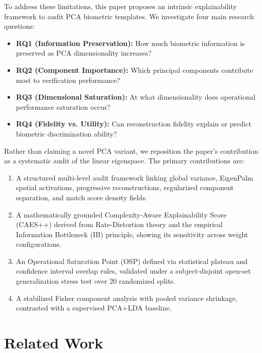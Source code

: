 \documentclass[conference]{IEEEtran}
\begin{document}
To address these limitations, this paper proposes an intrinsic explainability framework to audit PCA biometric templates. We investigate four main research questions:
\begin{itemize}
    \item \textbf{RQ1 (Information Preservation):} How much biometric information is preserved as PCA dimensionality increases?
    \item \textbf{RQ2 (Component Importance):} Which principal components contribute most to verification performance?
    \item \textbf{RQ3 (Dimensional Saturation):} At what dimensionality does operational performance saturation occur?
    \item \textbf{RQ4 (Fidelity vs. Utility):} Can reconstruction fidelity explain or predict biometric discrimination ability?
\end{itemize}

Rather than claiming a novel PCA variant, we reposition the paper's contribution as a systematic audit of the linear eigenspace. The primary contributions are:
\begin{enumerate}
    \item A structured multi-level audit framework linking global variance, EigenPalm spatial activations, progressive reconstructions, regularized component separation, and match score density fields.
    \item A mathematically grounded Complexity-Aware Explainability Score (CAES++) derived from Rate-Distortion theory and the empirical Information Bottleneck (IB) principle, showing its sensitivity across weight configurations.
    \item An Operational Saturation Point (OSP) defined via statistical plateau and confidence interval overlap rules, validated under a subject-disjoint open-set generalization stress test over 20 randomized splits.
    \item A stabilized Fisher component analysis with pooled variance shrinkage, contrasted with a supervised PCA+LDA baseline.
\end{enumerate}

\section{Related Work}
\label{sec:related}
\end{document}
